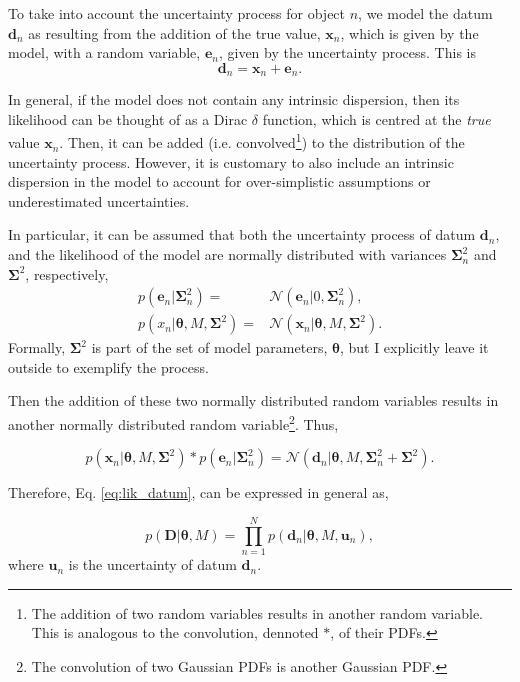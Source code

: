 {\color{red}
To take into account the uncertainty process for object $n$, we model the datum $\mathbf{d}_n$ as resulting from the addition of the true value, $\mathbf{x}_n$, which is given by the model, with a random variable, $\mathbf{e}_n$, given by the uncertainty process. This is
\begin{equation}
\mathbf{d}_n = \mathbf{x}_n + \mathbf{e}_n. \nonumber
\end{equation}

In general, if the model does not contain any intrinsic dispersion, then its likelihood can be thought of as a Dirac $\delta$ function, which is centred at the \emph{true} value $\mathbf{x}_n$. Then, it can be added (i.e. convolved\footnote{The addition of two random variables results in another random variable. This is analogous  to the convolution, dennoted $*$, of their PDFs.}) to the distribution of the uncertainty process. However, it is customary to also include an intrinsic dispersion in the model to account for over-simplistic assumptions or underestimated uncertainties. 

In particular, it can be assumed that both the uncertainty process of datum $\mathbf{d}_n$, and the likelihood of the model are normally distributed with variances $\boldsymbol{\Sigma}_n^2$ and $\boldsymbol{\Sigma}^2$, respectively, 
\begin{align}
p(\mathbf{e}_n|\mathbf{\Sigma}_n^2)= &\mathcal{N}(\mathbf{e}_n|0,\boldsymbol{\Sigma}_n^2), \nonumber\\
p(x_n|\boldsymbol{\theta},M,\mathbf{\Sigma}^2)= &\mathcal{N}(\mathbf{x}_n|\boldsymbol{\theta},M,\boldsymbol{\Sigma}^2).\nonumber
\end{align}
Formally, $\boldsymbol{\Sigma}^2$ is part of the set of model parameters, $\boldsymbol{\theta}$, but I explicitly leave it outside to exemplify the process. 

Then the addition of these two normally distributed random variables results in another normally distributed random variable\footnote{The convolution of two Gaussian PDFs is another Gaussian PDF.}. Thus,

\begin{equation}
p(\mathbf{x}_n|\boldsymbol{\theta},M,\boldsymbol{\Sigma}^2)*p(\mathbf{e}_n|\boldsymbol{\Sigma}_n^2) = \mathcal{N}(\mathbf{d}_n|\boldsymbol{\theta},M,\boldsymbol{\Sigma}_n^2+\boldsymbol{\Sigma}^2).
\end{equation}

Therefore, Eq. \ref{eq:lik_datum}, can be expressed in general as,

\begin{equation}
\label{eq:lik_generativemodel}
p(\mathbf{D}|\boldsymbol{\theta},M) = \prod_{n=1}^N p(\mathbf{d}_n|\boldsymbol{\theta},M,\mathbf{u}_n),
\end{equation}
where $\mathbf{u}_n$ is the uncertainty of datum $\mathbf{d}_n$.
}

